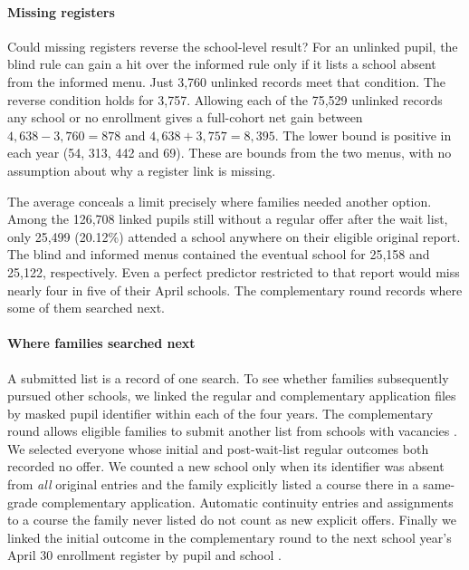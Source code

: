 \paragraph{Missing registers}
Could missing registers reverse the school-level result? For an unlinked pupil, the blind rule can gain a hit over the informed rule only if it lists a school absent from the informed menu. Just 3,760 unlinked records meet that condition. The reverse condition holds for 3,757. Allowing each of the 75,529 unlinked records any school or no enrollment gives a full-cohort net gain between $4,638-3,760=878$ and $4,638+3,757=8,395$. The lower bound is positive in each year (54, 313, 442 and 69). These are bounds from the two menus, with no assumption about why a register link is missing.

The average conceals a limit precisely where families needed another option. Among the 126,708 linked pupils still without a regular offer after the wait list, only 25,499 (20.12\%) attended a school anywhere on their eligible original report. The blind and informed menus contained the eventual school for 25,158 and 25,122, respectively. Even a perfect predictor restricted to that report would miss nearly four in five of their April schools. The complementary round records where some of them searched next.

\paragraph{Where families searched next}
A submitted list is a record of one search. To see whether families subsequently pursued other schools, we linked the regular and complementary application files by masked pupil identifier within each of the four years. The complementary round allows eligible families to submit another list from schools with vacancies \citep{complementary}. We selected everyone whose initial and post-wait-list regular outcomes both recorded no offer. We counted a new school only when its identifier was absent from \emph{all} original entries and the family explicitly listed a course there in a same-grade complementary application. Automatic continuity entries and assignments to a course the family never listed do not count as new explicit offers. Finally we linked the initial outcome in the complementary round to the next school year's April 30 enrollment register by pupil and school \citep{saedata,registerdata}.


